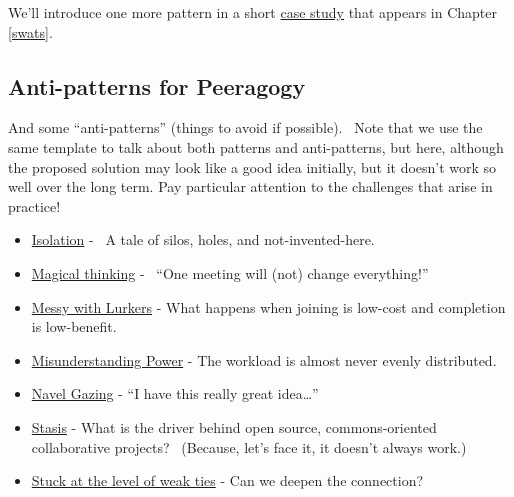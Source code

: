 We'll introduce one more pattern in a short
\href{http://peeragogy.org/case-study-learning-to-use-technology-with-peers-the-case-of-swats/}{case
  study} that appears in Chapter \ref{swats}.

\subsection{Anti-patterns for Peeragogy}

And some ``anti-patterns'' (things to avoid if possible).~ Note that we
use the same template to talk about both patterns and anti-patterns, but
here, although the proposed solution may look like a good idea
initially, but it doesn't work so well over the long term. Pay
particular attention to the challenges that arise in practice!

\begin{itemize}
\itemsep1pt\parskip0pt
\item
  \href{http://peeragogy.org/antipatterns/isolation/}{Isolation} -~ A
  tale of silos, holes, and not-invented-here.
\item
  \href{http://peeragogy.org/antipatterns/magical-thinking/}{Magical
  thinking} - ~``One meeting will (not) change everything!''
\item
  \href{http://peeragogy.org/antipatterns/co-learning-messy-with-lurkers/}{Messy
  with Lurkers} - What happens when joining is low-cost and completion
  is low-benefit.
\item
  \href{http://peeragogy.org/antipatterns/misunderstanding-power/}{Misunderstanding
  Power} - The workload is almost never evenly distributed.
\item
  \href{http://peeragogy.org/antipatterns/navel-gazing/}{Navel Gazing} -
  ``I have this really great idea\ldots{}''
\item
  \href{http://peeragogy.org/antipatterns/stasis/}{Stasis} - What is the
  driver behind open source, commons-oriented collaborative projects?~
  (Because, let's face it, it doesn't always work.)
\item
  \href{http://peeragogy.org/antipatterns/stuck-at-the-level-of-weak-ties/}{Stuck
  at the level of weak ties} - Can we deepen the connection?
\end{itemize}


